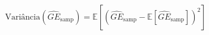 \documentclass[
  12pt,
  oneside,
  a4paper,
  chapter=TITLE,
  section=TITLE,
  brazil]{abntex2}
\begin{document}
\[\text{Variância}(\widehat{GE}_\text{samp}) = \mathbb{E}[(\widehat{GE}_\text{samp} - \mathbb{E}[\widehat{GE}_\text{samp}])^2]\]


\printbibliography


\postextual

%
%
%
%
%
%
%
%
%
%
%

\printindex
\end{document}

